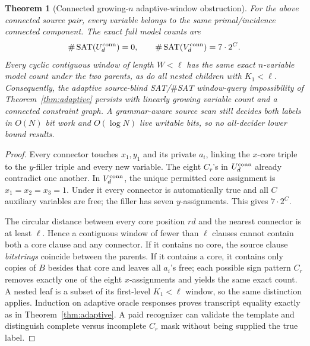 \documentclass[11pt]{article}
\newtheorem{theorem}{Theorem}
\begin{document}
\begin{theorem}[Connected growing-\(n\) adaptive-window obstruction]\label{thm:connected}
For the above connected source pair, every variable belongs to the same primal/incidence connected component. The exact full model counts are
\[
\#\operatorname{SAT}(U_d^{\rm conn})=0,\qquad
\#\operatorname{SAT}(V_d^{\rm conn})=7\cdot2^C.
\]
Every cyclic contiguous window of length \(W<\ell\) has the same exact \(n\)-variable model count under the two parents, as do all nested children with \(K_1<\ell\). Consequently, the adaptive source-blind SAT/\(\#\)SAT window-query impossibility of Theorem~\ref{thm:adaptive} persists with linearly growing variable count and a connected constraint graph. A grammar-aware source scan still decides both labels in \(O(N)\) bit work and \(O(\log N)\) live writable bits, so no all-decider lower bound results.
\end{theorem}
\begin{proof}
Every connector touches \(x_1,y_1\) and its private \(a_i\), linking the \(x\)-core triple to the \(y\)-filler triple and every new variable. The eight \(C_r\)'s in \(U_d^{\rm conn}\) already contradict one another. In \(V_d^{\rm conn}\), the unique permitted core assignment is \(x_1=x_2=x_3=1\). Under it every connector is automatically true and all \(C\) auxiliary variables are free; the filler has seven \(y\)-assignments. This gives \(7\cdot2^C\).

The circular distance between every core position \(rd\) and the nearest connector is at least \(\ell\). Hence a contiguous window of fewer than \(\ell\) clauses cannot contain both a core clause and any connector. If it contains no core, the source clause \emph{bitstrings} coincide between the parents. If it contains a core, it contains only copies of \(B\) besides that core and leaves all \(a_i\)'s free; each possible sign pattern \(C_r\) removes exactly one of the eight \(x\)-assignments and yields the same exact count. A nested leaf is a subset of its first-level \(K_1<\ell\) window, so the same distinction applies. Induction on adaptive oracle responses proves transcript equality exactly as in Theorem~\ref{thm:adaptive}. A paid recognizer can validate the template and distinguish complete versus incomplete \(C_r\) mask without being supplied the true label.
\end{proof}
\end{document}

